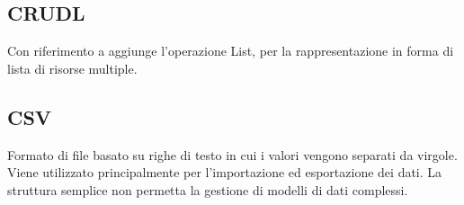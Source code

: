 \vspace{2em}
\subsection*{CRUDL}
\par Con riferimento a  aggiunge l'operazione List, per la rappresentazione in forma di lista di risorse multiple.

\vspace{2em}
\subsection*{CSV}
Formato di file basato su righe di testo in cui i valori vengono separati da virgole. Viene utilizzato principalmente per l'importazione ed esportazione dei dati. La struttura semplice non permetta la gestione di modelli di dati complessi.
